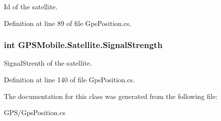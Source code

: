 Id of the satellite. 

Definition at line 89 of file GpsPosition.cs.\hypertarget{class_g_p_s_mobile_1_1_satellite_a1a2411ab8219133b5979291e50f7de31}{
\subsubsection[{SignalStrength}]{\setlength{\rightskip}{0pt plus 5cm}int GPSMobile.Satellite.SignalStrength}}
\label{class_g_p_s_mobile_1_1_satellite_a1a2411ab8219133b5979291e50f7de31}


SignalStrenth of the satellite. 

Definition at line 140 of file GpsPosition.cs.

The documentation for this class was generated from the following file:\begin{DoxyCompactItemize}
\item 
GPS/GpsPosition.cs\end{DoxyCompactItemize}
